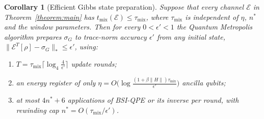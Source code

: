 \documentclass[aps,floatfix,10pt,amssymb,amsfont,amsmath,superscriptaddress,float,nofootinbib,longbibliography,nobalancelastpage,twocolumn]{revtex4-2}
\newtheorem{corollary}{Corollary}
\begin{document}
\begin{corollary}[Efficient Gibbs state preparation]
\label{corollary:polycost}
Suppose that every channel $\mathcal{E}$ in Theorem~\ref{theorem:main} has $t_{\mathrm{mix}}(\mathcal{E})\leq\tau_{\mathrm{mix}}$, where $\tau_{\mathrm{mix}}$ is independent of $\eta$, $n^*$ and the window parameters. Then for every $0<\epsilon'<1$ the Quantum Metropolis algorithm prepares $\sigma_G$ to trace-norm accuracy $\epsilon'$ from any initial state, $\|\mathcal{E}^T[\rho]-\sigma_G\|_*\leq\epsilon'$, using:
\begin{enumerate}
    \item[(i)] $T=\tau_{\mathrm{mix}}\big\lceil\log_4\frac{4}{\epsilon'}\big\rceil$ update rounds;
    \item[(ii)] an energy register of only $\eta=O\big(\log\frac{(1+\beta\|H\|)\tau_{\mathrm{mix}}}{\epsilon'}\big)$ ancilla qubits;
    \item[(iii)] at most $4n^*+6$ applications of BSI-QPE or its inverse per round, with rewinding cap $n^*=O(\tau_{\mathrm{mix}}/\epsilon')$.
\end{enumerate}
\end{corollary}
\end{document}
